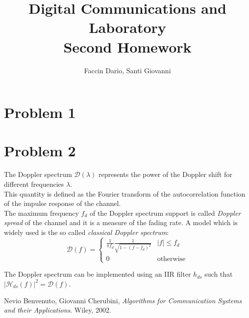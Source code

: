 \documentclass[a4paper, 12pt]{report}
\begin{document}
	
\title{Digital Communications and Laboratory \\ Second Homework}
\author{Faccin Dario, Santi Giovanni}
\date{}
\maketitle



\section*{Problem 1}

\section*{Problem 2}
The Doppler spectrum $\mathcal{D}(\lambda)$ represents the power of the Doppler shift for different frequencies $\lambda$.\\
This quantity is defined as the Fourier transform of the autocorrelation function of the impulse response of the channel.\\
The maximum frequency $f_d$ of the Doppler spectrum support is called \textit{Doppler spread} of the channel and it is a measure of the fading rate.
A model which is widely used is the so called \textit{classical Doppler spectrum}:
\begin{equation}
\mathcal{D}(f) =
\begin{cases}
\frac{1}{\pi f_d} \frac{1}{\sqrt{1-(f-f_d)^2}} & |f| \leq f_d \\
0 & \text{otherwise}
\end{cases}
\end{equation}

The Doppler spectrum can be implemented using an IIR filter $h_{ds}$ such that $|\mathcal{H}_{ds}(f)|^2 = \mathcal{D}(f)$.

\begin{thebibliography}{15}
	Nevio Benvenuto, Giovanni Cherubini,
	\textit{Algorithms for Communication Systems and their Applications}. 
	Wiley, 2002.
\end{thebibliography}
\end{document}
